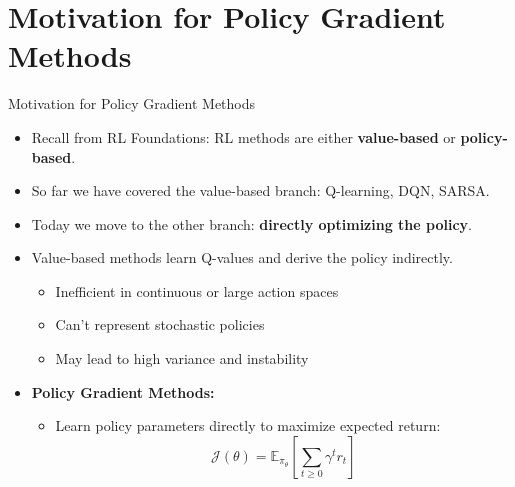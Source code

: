 \section{Motivation for Policy Gradient Methods}
\begin{frame}{Motivation for Policy Gradient Methods}
    \begin{itemize}
        \item Recall from RL Foundations: RL methods are either \textbf{value-based} or \textbf{policy-based}.
        \item So far we have covered the value-based branch: Q-learning, DQN, SARSA.
        \item Today we move to the other branch: \textbf{directly optimizing the policy}.
        \pause
        \item Value-based methods learn Q-values and derive the policy indirectly.
        \begin{itemize}
            \item Inefficient in continuous or large action spaces
            \item Can’t represent stochastic policies
            \item May lead to high variance and instability
        \end{itemize}
        \vspace{1em}
        \item[]\textbf{Policy Gradient Methods:}
        \begin{itemize}
            \item Learn policy parameters directly to maximize expected return:
            \[
                \mathcal{J}(\theta) = \mathbb{E}_{\pi_\theta}\!\left[\sum_{t \geq 0} \gamma^t r_t\right]
            \]
        \end{itemize}
    \end{itemize}
\end{frame}